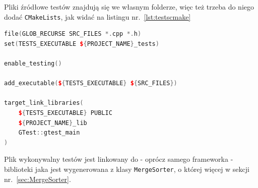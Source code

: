 Pliki źródłowe testów znajdują się we własnym folderze, więc też trzeba do niego dodać \texttt{CMakeLists}, jak widać na listingu nr.~\ref{lst:testscmake}

\begin{lstlisting}[caption=Dodanie Google Test do projektu, label={lst:testscmake}, language=C++]
file(GLOB_RECURSE SRC_FILES *.cpp *.h)
set(TESTS_EXECUTABLE ${PROJECT_NAME}_tests)

enable_testing()

add_executable(${TESTS_EXECUTABLE} ${SRC_FILES})

target_link_libraries(
	${TESTS_EXECUTABLE} PUBLIC
	${PROJECT_NAME}_lib
	GTest::gtest_main
)

\end{lstlisting}

Plik wykonywalny testów jest linkowany do - oprócz samego frameworka - biblioteki jaka jest wygenerowana z klasy \texttt{MergeSorter}, o której więcej w sekcji nr.~\ref{sec:MergeSorter}.
